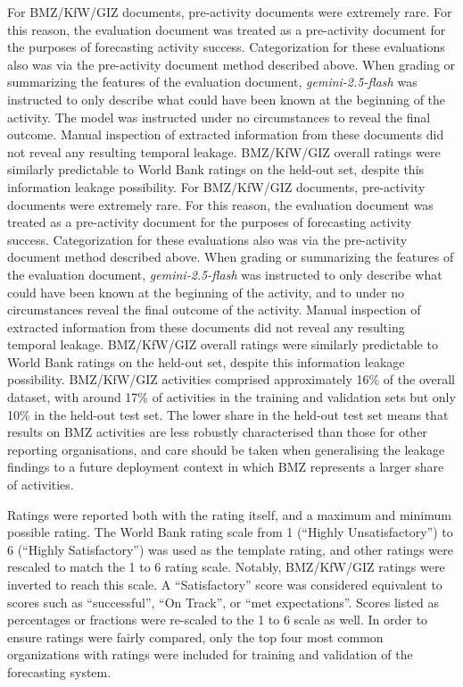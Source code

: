 For BMZ/KfW/GIZ documents, pre-activity documents were extremely rare. For this reason, the evaluation document was treated as a pre-activity document for the purposes of forecasting activity success. Categorization for these evaluations also was via the pre-activity document method described above. When grading or summarizing the features of the evaluation document, \emph{gemini-2.5-flash} was instructed to only describe what could have been known at the beginning of the activity. The model was instructed under no circumstances to reveal the final outcome. Manual inspection of extracted information from these documents did not reveal any resulting temporal leakage.  BMZ/KfW/GIZ overall ratings were similarly predictable to World Bank ratings on the held-out set, despite this information leakage possibility.
For BMZ/KfW/GIZ documents, pre-activity documents were extremely rare. For this reason, the evaluation document was treated as a pre-activity document for the purposes of forecasting activity success. Categorization for these evaluations also was via the pre-activity document method described above. When grading or summarizing the features of the evaluation document, \emph{gemini-2.5-flash} was instructed to only describe what could have been known at the beginning of the activity, and to under no circumstances reveal the final outcome of the activity. Manual inspection of extracted information from these documents did not reveal any resulting temporal leakage.  BMZ/KfW/GIZ overall ratings were similarly predictable to World Bank ratings on the held-out set, despite this information leakage possibility. BMZ/KfW/GIZ activities comprised approximately 16\% of the overall dataset, with around 17\% of activities in the training and validation sets but only 10\% in the held-out test set. The lower share in the held-out test set means that results on BMZ activities are less robustly characterised than those for other reporting organisations, and care should be taken when generalising the leakage findings to a future deployment context in which BMZ represents a larger share of activities.





Ratings were reported both with the rating itself, and a maximum and minimum possible rating. The World Bank rating scale from 1 (``Highly Unsatisfactory'') to 6 (``Highly Satisfactory'') was used as the template rating, and other ratings were rescaled to match the 1 to 6 rating scale. Notably, BMZ/KfW/GIZ ratings were inverted to reach this scale. A ``Satisfactory'' score was considered equivalent to scores such as ``successful'', ``On Track'', or ``met expectations''. Scores listed as percentages or fractions were re-scaled to the 1 to 6 scale as well. In order to ensure ratings were fairly compared, only the top four most common organizations with ratings were included for training and validation of the forecasting system. 


